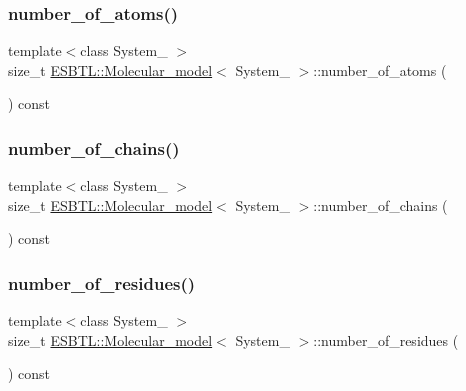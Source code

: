\subsubsection{\texorpdfstring{number\+\_\+of\+\_\+atoms()}{number\_of\_atoms()}}
{\footnotesize\ttfamily template$<$class System\+\_\+ $>$ \\
size\+\_\+t \hyperlink{classESBTL_1_1Molecular__model}{E\+S\+B\+T\+L\+::\+Molecular\+\_\+model}$<$ System\+\_\+ $>$\+::number\+\_\+of\+\_\+atoms (\begin{DoxyParamCaption}{ }\end{DoxyParamCaption}) const\hspace{0.3cm}{\ttfamily [inline]}}

\mbox{\label{classESBTL_1_1Molecular__model_aee31a3089df42d921fd3c2a3be5314c7}} 
\subsubsection{\texorpdfstring{number\+\_\+of\+\_\+chains()}{number\_of\_chains()}}
{\footnotesize\ttfamily template$<$class System\+\_\+ $>$ \\
size\+\_\+t \hyperlink{classESBTL_1_1Molecular__model}{E\+S\+B\+T\+L\+::\+Molecular\+\_\+model}$<$ System\+\_\+ $>$\+::number\+\_\+of\+\_\+chains (\begin{DoxyParamCaption}{ }\end{DoxyParamCaption}) const\hspace{0.3cm}{\ttfamily [inline]}}

\mbox{\label{classESBTL_1_1Molecular__model_ab587c75941099a8df3daedd022376ee5}} 
\subsubsection{\texorpdfstring{number\+\_\+of\+\_\+residues()}{number\_of\_residues()}}
{\footnotesize\ttfamily template$<$class System\+\_\+ $>$ \\
size\+\_\+t \hyperlink{classESBTL_1_1Molecular__model}{E\+S\+B\+T\+L\+::\+Molecular\+\_\+model}$<$ System\+\_\+ $>$\+::number\+\_\+of\+\_\+residues (\begin{DoxyParamCaption}{ }\end{DoxyParamCaption}) const\hspace{0.3cm}{\ttfamily [inline]}}

